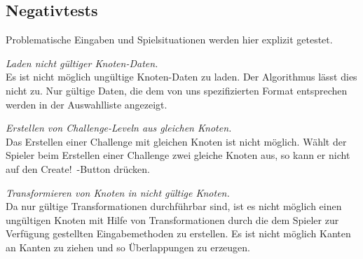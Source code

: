 %



\newpage



\label{Abschnitt:Tests:Protokoll:Negativ}



\subsection*{Negativtests}

Problematische Eingaben und Spielsituationen werden hier explizit getestet.\\



\begin{description}



\label{NT:10}

	\item[NT\_10] \textit{Laden nicht gültiger Knoten-Daten.} \hfill\\
	
	Es ist nicht möglich ungültige Knoten-Daten zu laden. Der Algorithmus lässt dies nicht zu. Nur gültige Daten, die dem von uns spezifizierten Format entsprechen werden in der Auswahlliste angezeigt.\\

	

\label{NT:20}
	
	\item[NT\_20] \textit{Erstellen von Challenge-Leveln aus gleichen Knoten.} \hfill\\
	
	Das Erstellen einer Challenge mit gleichen Knoten ist nicht möglich. Wählt der Spieler beim Erstellen einer Challenge zwei gleiche Knoten aus, so kann er nicht auf den \glqq Create!\grqq~-Button drücken.\\
	
	

\label{NT:30}

	\item[NT\_30] \textit{Transformieren von Knoten in nicht gültige Knoten.} \hfill\\
	
	Da nur gültige Transformationen durchführbar sind, ist es nicht möglich einen ungültigen Knoten mit Hilfe von Transformationen durch die dem Spieler zur Verfügung gestellten Eingabemethoden zu erstellen. Es ist nicht möglich Kanten an Kanten zu ziehen und so Überlappungen zu erzeugen.\\
	


\end{description}
